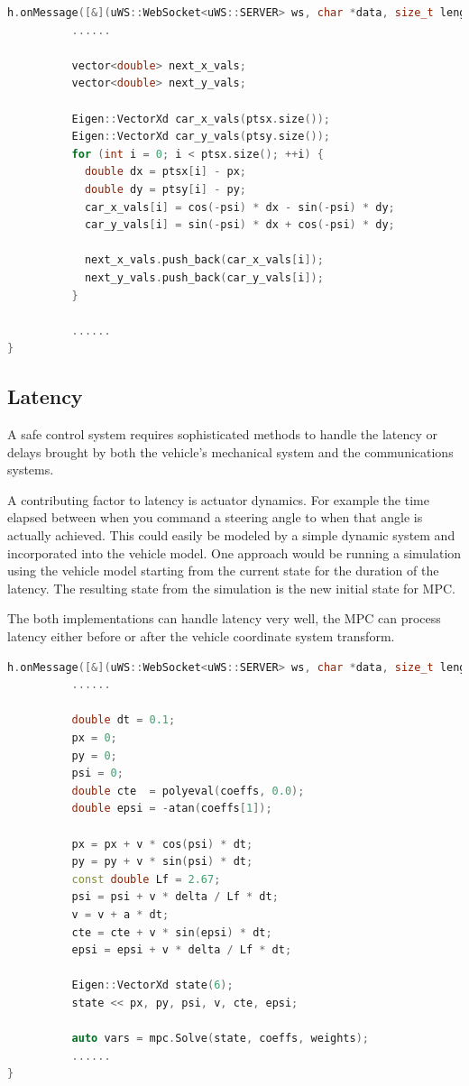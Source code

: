 \begin{lstlisting}[label={list:list1},language=C++,caption=Car's coordinate transform.]
h.onMessage([&](uWS::WebSocket<uWS::SERVER> ws, char *data, size_t length, uWS::OpCode opCode) {
          ......

          vector<double> next_x_vals;
          vector<double> next_y_vals;

          Eigen::VectorXd car_x_vals(ptsx.size());
          Eigen::VectorXd car_y_vals(ptsy.size());
          for (int i = 0; i < ptsx.size(); ++i) {
            double dx = ptsx[i] - px;
            double dy = ptsy[i] - py;
            car_x_vals[i] = cos(-psi) * dx - sin(-psi) * dy;
            car_y_vals[i] = sin(-psi) * dx + cos(-psi) * dy;

            next_x_vals.push_back(car_x_vals[i]);
            next_y_vals.push_back(car_y_vals[i]);
          }

          ......
}

\end{lstlisting}

\subsection{Latency}

A safe control system requires sophisticated methods to handle the latency or delays brought by both the vehicle’s mechanical system and the communications systems.

A contributing factor to latency is actuator dynamics. For example the time elapsed between when you command a steering angle to when that angle is actually achieved. This could easily be modeled by a simple dynamic system and incorporated into the vehicle model. One approach would be running a simulation using the vehicle model starting from the current state for the duration of the latency. The resulting state from the simulation is the new initial state for MPC.

The both implementations can handle latency very well, the MPC can process latency either before or after the vehicle coordinate system transform.

\begin{lstlisting}[label={list:list2},language=C++,caption=Handle latency after car's coordinate transform.]
h.onMessage([&](uWS::WebSocket<uWS::SERVER> ws, char *data, size_t length, uWS::OpCode opCode) {
          ......

          double dt = 0.1;
          px = 0;
          py = 0;
          psi = 0;
          double cte  = polyeval(coeffs, 0.0);
          double epsi = -atan(coeffs[1]);

          px = px + v * cos(psi) * dt;
          py = py + v * sin(psi) * dt;
          const double Lf = 2.67;
          psi = psi + v * delta / Lf * dt;
          v = v + a * dt;
          cte = cte + v * sin(epsi) * dt;
          epsi = epsi + v * delta / Lf * dt;

          Eigen::VectorXd state(6);
          state << px, py, psi, v, cte, epsi;

          auto vars = mpc.Solve(state, coeffs, weights);
          ......
}

\end{lstlisting}

